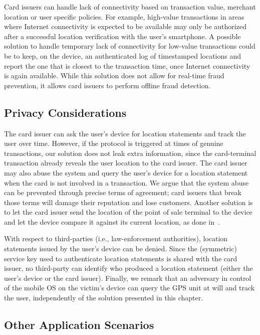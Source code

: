 Card issuers can handle lack of connectivity based on transaction value,
merchant location or user specific policies. For example, high-value
transactions in areas where Internet connectivity is expected to be available
may only be authorized after a successful location verification with the user's
smartphone. A possible solution to handle temporary lack of connectivity for
low-value transactions could be to keep, on the device, an authenticated log of
timestamped locations and report the one that is closest to the transaction
time, once Internet connectivity is again available.  While this solution does
not allow for real-time fraud prevention, it allows card issuers to perform
offline fraud detection.

\subsection{Privacy Considerations}

The card issuer can ask the user's device for location statements and track the
user over time.  However, if the protocol is triggered at times of genuine
transactions, our solution does not leak extra information, since the
card-terminal transaction already reveals the user location to the card
issuer. The card issuer may also abuse the system and query the user's device
for a location statement when the card is not involved in a transaction.  We
argue that the system abuse can be prevented through precise terms of agreement;
card issuers that break those terms will damage their reputation and lose
customers.  Another solution is to let the card issuer send the location of the
point of sale terminal to the device and let the device compare it against its
current location, as done in~\cite{park09acsac}.

With respect to third-parties (i.e., law-enforcement authorities), location
statements issued by the user's device can be denied.  Since the (symmetric)
service key used to authenticate location statements is shared with the card
issuer, no third-party can identify who produced a location statement (either
the user's device or the card issuer). Finally, we remark that an adversary in
control of the mobile OS on the victim's device can query the GPS unit at will
and track the user, independently of the solution presented in this chapter.

\subsection{Other Application Scenarios}

